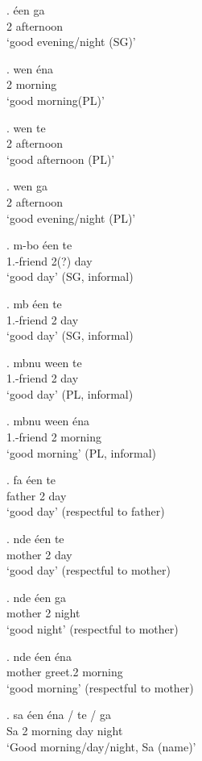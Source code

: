 \documentclass{assets/fieldnotes}
\begin{document}
\exg. éen ga\\
2 afternoon\\
`good evening/night (SG)' 

\exg. wen éna\\
2 morning\\
`good morning(PL)' 

\exg. wen te\\
2 afternoon\\
`good afternoon (PL)' 

\exg. wen ga\\
2 afternoon\\
`good evening/night (PL)' 


\exg. m-bo éen te\\
1\Sg{}.\Poss{}-friend 2\Sg{}(?) day\\
`good day' (SG, informal) 

\exg. mb éen te\\
1\Sg{}.\Poss{}-friend 2\Sg{} day\\
`good day' (SG, informal)

\exg. mbnu ween te\\
1\Sg{}.\Poss{}-friend 2\Sg{} day\\
`good day' (PL, informal)

\exg. mbnu ween éna\\
1\Sg{}.\Poss{}-friend 2\Pl{} morning\\
`good morning' (PL, informal)

\exg. fa éen te\\
father 2\Sg{} day\\
`good day' (respectful to father)

\exg. nde éen te\\
mother 2\Sg{} day\\
`good day' (respectful to mother)

\exg. nde éen ga\\
mother 2\Sg{} night\\
`good night' (respectful to mother)

\exg. nde éen éna\\
mother greet.2\Sg{} morning\\
`good morning' (respectful to mother)

\exg. sa éen éna / te / ga\\
Sa 2\Sg{} morning {} day {} night\\
`Good morning/day/night, Sa (name)'
\end{document}
